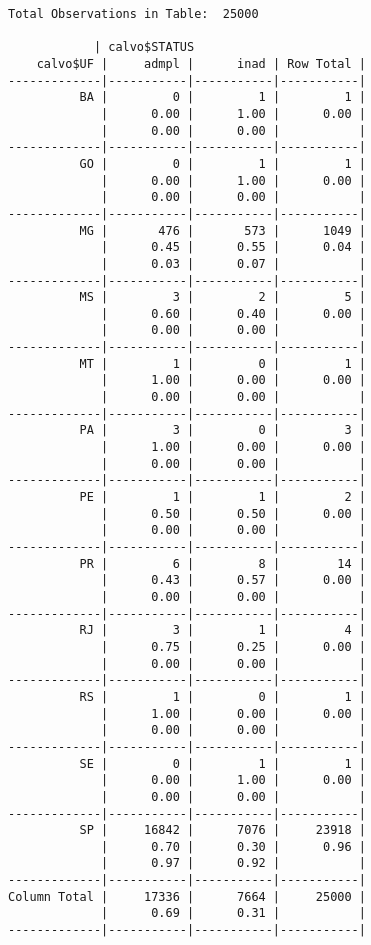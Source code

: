 \begin{lstlisting}
Total Observations in Table:  25000 
 
            | calvo$STATUS 
    calvo$UF |     admpl |      inad | Row Total | 
-------------|-----------|-----------|-----------|
          BA |         0 |         1 |         1 | 
             |      0.00 |      1.00 |      0.00 | 
             |      0.00 |      0.00 |           | 
-------------|-----------|-----------|-----------|
          GO |         0 |         1 |         1 | 
             |      0.00 |      1.00 |      0.00 | 
             |      0.00 |      0.00 |           | 
-------------|-----------|-----------|-----------|
          MG |       476 |       573 |      1049 | 
             |      0.45 |      0.55 |      0.04 | 
             |      0.03 |      0.07 |           | 
-------------|-----------|-----------|-----------|
          MS |         3 |         2 |         5 | 
             |      0.60 |      0.40 |      0.00 | 
             |      0.00 |      0.00 |           | 
-------------|-----------|-----------|-----------|
          MT |         1 |         0 |         1 | 
             |      1.00 |      0.00 |      0.00 | 
             |      0.00 |      0.00 |           | 
-------------|-----------|-----------|-----------|
          PA |         3 |         0 |         3 | 
             |      1.00 |      0.00 |      0.00 | 
             |      0.00 |      0.00 |           | 
-------------|-----------|-----------|-----------|
          PE |         1 |         1 |         2 | 
             |      0.50 |      0.50 |      0.00 | 
             |      0.00 |      0.00 |           | 
-------------|-----------|-----------|-----------|
          PR |         6 |         8 |        14 | 
             |      0.43 |      0.57 |      0.00 | 
             |      0.00 |      0.00 |           | 
-------------|-----------|-----------|-----------|
          RJ |         3 |         1 |         4 | 
             |      0.75 |      0.25 |      0.00 | 
             |      0.00 |      0.00 |           | 
-------------|-----------|-----------|-----------|
          RS |         1 |         0 |         1 | 
             |      1.00 |      0.00 |      0.00 | 
             |      0.00 |      0.00 |           | 
-------------|-----------|-----------|-----------|
          SE |         0 |         1 |         1 | 
             |      0.00 |      1.00 |      0.00 | 
             |      0.00 |      0.00 |           | 
-------------|-----------|-----------|-----------|
          SP |     16842 |      7076 |     23918 | 
             |      0.70 |      0.30 |      0.96 | 
             |      0.97 |      0.92 |           | 
-------------|-----------|-----------|-----------|
Column Total |     17336 |      7664 |     25000 | 
             |      0.69 |      0.31 |           | 
-------------|-----------|-----------|-----------|
\end{lstlisting}



